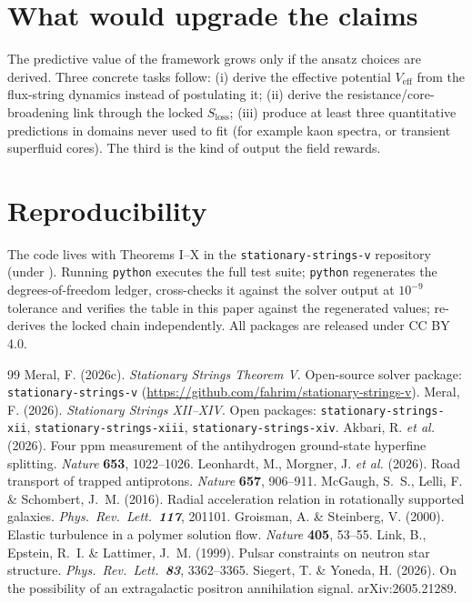 \documentclass[12pt,a4paper]{article}
\begin{document}
\section{What would upgrade the claims}
The predictive value of the framework grows only if the ansatz choices are
derived. Three concrete tasks follow: (i) derive the effective potential
$V_{\mathrm{eff}}$ from the flux-string dynamics instead of postulating
it; (ii) derive the resistance/core-broadening link through the locked
$S_{\mathrm{loss}}$; (iii) produce at least three quantitative predictions
in domains never used to fit (for example kaon spectra, or transient
superfluid cores). The third is the kind of output the field rewards.

\section{Reproducibility}
The code lives with Theorems I--X in the \texttt{stationary-strings-v}
repository (under ). Running \texttt{python}
 executes the full test suite; \texttt{python}
 regenerates the degrees-of-freedom ledger, cross-checks it
against the solver output at $10^{-9}$ tolerance and verifies the table
in this paper against the regenerated values; 
re-derives the locked chain independently. All packages are released under
CC BY 4.0.

\begin{thebibliography}{99}
     Meral, F. (2026c). \textit{Stationary Strings
    Theorem V}. Open-source solver package: \texttt{stationary-strings-v}
    (\url{https://github.com/fahrim/stationary-strings-v}).
     Meral, F. (2026). \textit{Stationary Strings XII--XIV}.
    Open packages: \texttt{stationary-strings-xii}, \texttt{stationary-strings-xiii},
    \texttt{stationary-strings-xiv}.
     Akbari, R. \textit{et al.} (2026). Four ppm measurement of
    the antihydrogen ground-state hyperfine splitting. \textit{Nature}
    \textbf{653}, 1022--1026.
     Leonhardt, M., Morgner, J. \textit{et al.} (2026). Road
    transport of trapped antiprotons. \textit{Nature} \textbf{657}, 906--911.
     McGaugh, S.~S., Lelli, F. \& Schombert, J.~M. (2016).
    Radial acceleration relation in rotationally supported galaxies.
    \textit{Phys.\ Rev.\ Lett.\ \textbf{117}}, 201101.
     Groisman, A. \& Steinberg, V. (2000). Elastic turbulence in
    a polymer solution flow. \textit{Nature} \textbf{405}, 53--55.
     Link, B., Epstein, R.~I. \& Lattimer, J.~M. (1999).
    Pulsar constraints on neutron star structure.
    \textit{Phys.\ Rev.\ Lett.\ \textbf{83}}, 3362--3365.
     Siegert, T. \& Yoneda, H. (2026). On the possibility of an
    extragalactic positron annihilation signal. arXiv:2605.21289.
\end{thebibliography}
\end{document}
